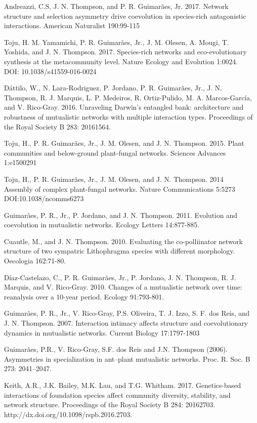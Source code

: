 \documentclass[fleqn,10pt]{wlscirep}
\begin{document}
Andreazzi, C.S, J. N. Thompson, and P. R. Guimarães, Jr. 2017. Network
structure and selection asymmetry drive coevolution in species-rich
antagonistic interactions. American Naturalist 190:99-115

Toju, H. M. Yamamichi, P. R. Guimarães, Jr., J. M. Olesen, A. Mougi,
T. Yoshida, and J. N. Thompson. 2017. Species-rich networks and
eco-evolutionary synthesis at the metacommunity level. Nature Ecology
and Evolution 1:0024. DOI: 10.1038/s41559-016-0024

Dáttilo, W., N. Lara-Rodriguez, P. Jordano, P. R. Guimarães, Jr.,
J. N. Thompson, R. J. Marquis, L. P. Medeiros, R. Ortiz-Pulido,
M. A. Marcos-García, and V. Rico-Gray. 2016. Unraveling Darwin's
entangled bank: architecture and robustness of mutualistic networks
with multiple interaction types. Proceedings of the Royal Society B
283: 20161564.

Toju, H., P. R. Guimarães, Jr., J. M. Olesen, and
J. N. Thompson. 2015. Plant communities and below-ground plant-fungal
networks. Sciences Advances 1:e1500291

Toju, H., P. R. Guimarães, Jr., J. M. Olesen, and J. N. Thompson. 2014
Assembly of complex plant-fungal networks. Nature Communications
5:5273 DOI:10.1038/ncomms6273

Guimarães, P. R., Jr., P. Jordano, and J. N. Thompson. 2011. Evolution
and coevolution in mutualistic networks. Ecology Letters 14:877-885.

Cuautle, M., and J. N. Thompson. 2010. Evaluating the co-polliinator
network structure of two sympatric Lithophragma species with different
morphology. Oecologia 162:71-80.

Díaz-Castelazo, C., P. R. Guimarães, Jr., P. Jordano, J. N. Thompson,
R. J. Marquis, and V. Rico-Gray. 2010. Changes of a mutualistic
network over time: reanalysis over a 10-year period. Ecology
91:793-801.

Guimarães, P. R., Jr., V. Rico-Gray, P.S. Oliveira, T. J. Izzo,
S. F. dos Reis, and J. N. Thompson. 2007. Interaction intimacy affects
structure and coevolutionary dynamics in mutualistic networks. Current
Biology 17:1797-1803

Guimarães, P.R., V. Rico-Gray, S.F. dos Reis and J.N. Thompson
(2006). Asymmetries in specialization in ant–plant mutualistic
networks. Proc. R. Soc. B 273: 2041–2047.

Keith, A.R., J.K. Bailey, M.K. Lau, and T.G. Whitham.  2017.
Genetics-based interactions of foundation species affect community
diversity, stability, and network structure.  Proceedings of the Royal
Society B 284: 20162703. http://dx.doi.org/10.1098/rspb.2016.2703.
\end{document}
